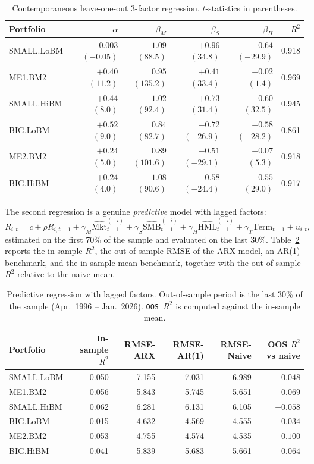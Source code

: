 \documentclass[11pt,a4paper]{article}
\begin{document}
\begin{table}[h!]
\centering
\caption{Contemporaneous leave-one-out 3-factor regression. $t$-statistics in parentheses.}
\label{tab:factor}
\small
\begin{tabular}{lrrrrr}
\toprule
Portfolio & $\alpha$ & $\beta_{M}$ & $\beta_{S}$ & $\beta_{H}$ & $R^2$ \\
\midrule
SMALL.LoBM & $-0.003$ $(-0.05)$ & $1.09$ $(88.5)$ & $+0.96$ $(34.8)$ & $-0.64$ $(-29.9)$ & 0.918 \\
ME1.BM2    & $+0.40$ $(11.2)$ & $0.95$ $(135.2)$ & $+0.41$ $(33.4)$ & $+0.02$ $(1.4)$  & 0.969 \\
SMALL.HiBM & $+0.44$ $(8.0)$  & $1.02$ $(92.4)$ & $+0.73$ $(31.4)$ & $+0.60$ $(32.5)$ & 0.945 \\
BIG.LoBM   & $+0.52$ $(9.0)$  & $0.84$ $(82.7)$ & $-0.72$ $(-26.9)$ & $-0.58$ $(-28.2)$ & 0.861 \\
ME2.BM2    & $+0.24$ $(5.0)$  & $0.89$ $(101.6)$ & $-0.51$ $(-29.1)$ & $+0.07$ $(5.3)$  & 0.918 \\
BIG.HiBM   & $+0.24$ $(4.0)$  & $1.08$ $(90.6)$ & $-0.58$ $(-24.4)$ & $+0.55$ $(29.0)$ & 0.917 \\
\bottomrule
\end{tabular}
\end{table}

The second regression is a genuine \emph{predictive} model with lagged factors:
\[
R_{i,t} = c + \rho R_{i,t-1} + \gamma_M \widehat{\text{Mkt}}^{(-i)}_{t-1} + \gamma_S \widehat{\text{SMB}}^{(-i)}_{t-1} + \gamma_H \widehat{\text{HML}}^{(-i)}_{t-1} + \gamma_T \text{Term}_{t-1} + u_{i,t},
\]
estimated on the first 70\% of the sample and evaluated on the last 30\%. Table~\ref{tab:predictive} reports the in-sample $R^2$, the out-of-sample RMSE of the ARX model, an AR(1) benchmark, and the in-sample-mean benchmark, together with the out-of-sample $R^2$ relative to the naive mean.

\begin{table}[h!]
\centering
\caption{Predictive regression with lagged factors. Out-of-sample period is the last 30\% of the sample (Apr.\ 1996 -- Jan.\ 2026). \texttt{OOS $R^2$} is computed against the in-sample mean.}
\label{tab:predictive}
\small
\begin{tabular}{lrrrrr}
\toprule
Portfolio & In-sample $R^2$ & RMSE-ARX & RMSE-AR(1) & RMSE-Naive & OOS $R^2$ vs naive \\
\midrule
SMALL.LoBM & 0.050 & 7.155 & 7.031 & 6.989 & $-0.048$ \\
ME1.BM2    & 0.056 & 5.843 & 5.745 & 5.651 & $-0.069$ \\
SMALL.HiBM & 0.062 & 6.281 & 6.131 & 6.105 & $-0.058$ \\
BIG.LoBM   & 0.015 & 4.632 & 4.569 & 4.555 & $-0.034$ \\
ME2.BM2    & 0.053 & 4.755 & 4.574 & 4.535 & $-0.100$ \\
BIG.HiBM   & 0.041 & 5.839 & 5.683 & 5.661 & $-0.064$ \\
\bottomrule
\end{tabular}
\end{table}
\end{document}
